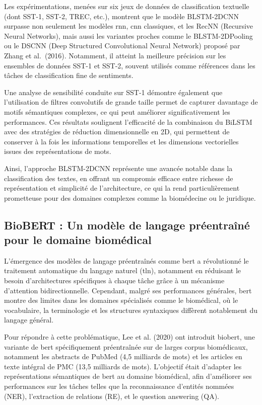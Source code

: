\documentclass[12pt]{report}
\begin{document}
Les expérimentations, menées sur six jeux de données de classification textuelle (dont SST-1, SST-2, TREC, etc.), montrent que le modèle BLSTM-2DCNN surpasse non seulement les modèles \gls{rnn}, \gls{cnn} classiques, et les RecNN (Recursive Neural Networks), mais aussi les variantes proches comme le BLSTM-2DPooling ou le DSCNN (Deep Structured Convolutional Neural Network) proposé par Zhang et al.~(2016). Notamment, il atteint la meilleure précision sur les ensembles de données SST-1 et SST-2, souvent utilisés comme références dans les tâches de classification fine de sentiments.

Une analyse de sensibilité conduite sur SST-1 démontre également que l’utilisation de filtres convolutifs de grande taille permet de capturer davantage de motifs sémantiques complexes, ce qui peut améliorer significativement les performances. Ces résultats soulignent l’efficacité de la combinaison du BiLSTM avec des stratégies de réduction dimensionnelle en 2D, qui permettent de conserver à la fois les informations temporelles et les dimensions vectorielles issues des représentations de mots.

Ainsi, l’approche BLSTM-2DCNN représente une avancée notable dans la classification des textes, en offrant un compromis efficace entre richesse de représentation et simplicité de l’architecture, ce qui la rend particulièrement prometteuse pour des domaines complexes comme la biomédecine ou le juridique.

\subsection{BioBERT : Un modèle de langage préentraîné pour le domaine biomédical}

L’émergence des modèles de langage préentraînés comme \gls{bert} a révolutionné le traitement automatique du langage naturel (\gls{tln}), notamment en réduisant le besoin d’architectures spécifiques à chaque tâche grâce à un mécanisme d'attention bidirectionnelle. Cependant, malgré ses performances générales, \gls{bert} montre des limites dans les domaines spécialisés comme le biomédical, où le vocabulaire, la terminologie et les structures syntaxiques diffèrent notablement du langage général.

Pour répondre à cette problématique, Lee et al. (2020) ont introduit \gls{biobert}, une variante de \gls{bert} spécifiquement préentraînée sur de larges corpus biomédicaux, notamment les abstracts de PubMed (4,5 milliards de mots) et les articles en texte intégral de PMC (13,5 milliards de mots). L’objectif était d’adapter les représentations sémantiques de \gls{bert} au domaine biomédical, afin d'améliorer ses performances sur les tâches telles que la reconnaissance d’entités nommées (NER), l’extraction de relations (RE), et le question answering (QA).
\end{document}
